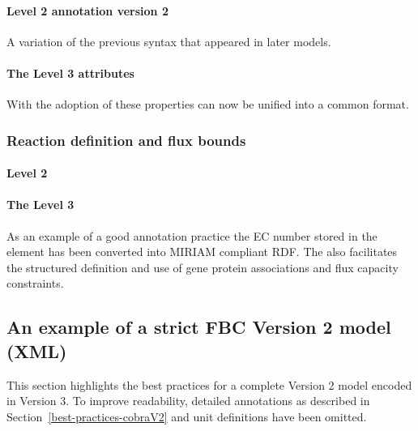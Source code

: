 \paragraph{\SBML Level 2 \Species annotation version 2}
A variation of the previous syntax that appeared in later models.

\bigskip\smallskip
{}

\paragraph{The \SBML Level 3 \FBC \Species attributes}
With the adoption of \SBML \FBC these \Species properties can now be unified into a common format.
%

\subsubsection*{Reaction definition and flux bounds}
\paragraph{\SBML Level 2 \Reaction}
%


\paragraph{The \SBML Level 3 \FBC \Reaction}

As an example of a good annotation practice the \textsf{EC number} stored in the \Notes element has been converted into MIRIAM compliant RDF. The \FBCPackage also facilitates the structured definition and use of gene protein associations and flux capacity constraints.
%
\bigskip\bigskip
{}
%

\newpage
\subsection{An example of a strict FBC Version 2 model (XML)}
\label{best-practices-V2}
This section highlights the best practices for a complete \FBC Version 2 model encoded in \FBC Version 3. To improve readability, detailed annotations as described in Section~\ref{best-practices-cobraV2} and unit definitions have been omitted.

